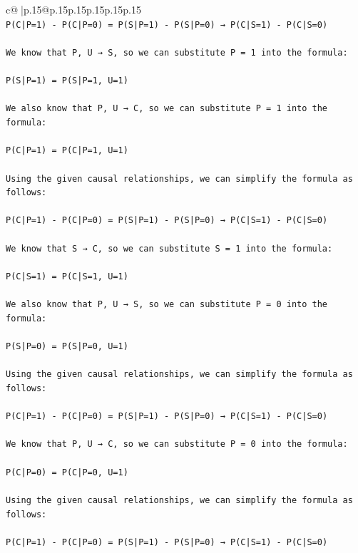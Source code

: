\documentclass{article}
\begin{document}
{\begin{supertabular}{c@{$\;$}|p{.15\linewidth}@{}p{.15\linewidth}p{.15\linewidth}p{.15\linewidth}p{.15\linewidth}p{.15\linewidth}}
{{{\\ 
\texttt{P(C|P=1) {-} P(C|P=0) = P(S|P=1) {-} P(S|P=0) → P(C|S=1) {-} P(C|S=0)} \\
\\ 
\texttt{We know that P, U → S, so we can substitute P = 1 into the formula:} \\
\\ 
\texttt{P(S|P=1) = P(S|P=1, U=1)} \\
\\ 
\texttt{We also know that P, U → C, so we can substitute P = 1 into the formula:} \\
\\ 
\texttt{P(C|P=1) = P(C|P=1, U=1)} \\
\\ 
\texttt{Using the given causal relationships, we can simplify the formula as follows:} \\
\\ 
\texttt{P(C|P=1) {-} P(C|P=0) = P(S|P=1) {-} P(S|P=0) → P(C|S=1) {-} P(C|S=0)} \\
\\ 
\texttt{We know that S → C, so we can substitute S = 1 into the formula:} \\
\\ 
\texttt{P(C|S=1) = P(C|S=1, U=1)} \\
\\ 
\texttt{We also know that P, U → S, so we can substitute P = 0 into the formula:} \\
\\ 
\texttt{P(S|P=0) = P(S|P=0, U=1)} \\
\\ 
\texttt{Using the given causal relationships, we can simplify the formula as follows:} \\
\\ 
\texttt{P(C|P=1) {-} P(C|P=0) = P(S|P=1) {-} P(S|P=0) → P(C|S=1) {-} P(C|S=0)} \\
\\ 
\texttt{We know that P, U → C, so we can substitute P = 0 into the formula:} \\
\\ 
\texttt{P(C|P=0) = P(C|P=0, U=1)} \\
\\ 
\texttt{Using the given causal relationships, we can simplify the formula as follows:} \\
\\ 
\texttt{P(C|P=1) {-} P(C|P=0) = P(S|P=1) {-} P(S|P=0) → P(C|S=1) {-} P(C|S=0)} \\
}}}
\end{supertabular}}
\end{document}
